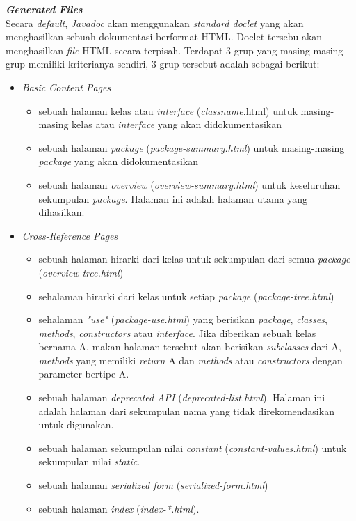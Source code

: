 \documentclass[a4paper,twoside]{article}
\begin{document}
\begin{enumerate}
\begin{enumerate}
\textbf{\textit{Generated Files}}\\
Secara {\it default}, {\it Javadoc} akan menggunakan {\it standard doclet} yang akan menghasilkan sebuah dokumentasi berformat HTML. Doclet tersebu akan menghasilkan {\it file} HTML secara terpisah. Terdapat 3 grup yang masing-masing grup memiliki kriterianya sendiri, 3 grup tersebut adalah sebagai berikut:
\begin{itemize}
	\item {\it Basic Content Pages}
	\begin{itemize}
		\item sebuah halaman kelas atau {\it interface} ({\it classname}.html) untuk masing-masing kelas atau {\it interface} yang akan didokumentasikan
		\item sebuah halaman {\it package} ({\it package-summary.html}) untuk masing-masing {\it package} yang akan didokumentasikan
		\item sebuah halaman {\it overview} ({\it overview-summary.html}) untuk keseluruhan sekumpulan {\it package}. Halaman ini adalah halaman utama yang dihasilkan.
	\end{itemize}
	\item {\it Cross-Reference Pages}
	\begin{itemize}
		\item sebuah halaman hirarki dari kelas untuk sekumpulan dari semua {\it package} ({\it overview-tree.html})
		\item sehalaman hirarki dari kelas untuk setiap {\it package} ({\it package-tree.html})
		\item sehalaman {\it "use"} ({\it package-use.html}) yang berisikan {\it package}, {\it classes}, {\it methods}, {\it constructors} atau {\it interface}. Jika diberikan sebuah kelas bernama A, makan halaman tersebut akan berisikan {\it subclasses} dari A, {\it methods} yang memiliki {\it return} A dan {\it methods} atau {\it constructors} dengan parameter bertipe A.
		\item sebuah halaman {\it deprecated API} ({\it deprecated-list.html}). Halaman ini adalah halaman dari sekumpulan nama yang tidak direkomendasikan untuk digunakan.
		\item sebuah halaman sekumpulan nilai {\it constant} ({\it constant-values.html}) untuk sekumpulan nilai {\it static}.
		\item sebuah halaman {\it serialized form} ({\it serialized-form.html})
		\item sebuah halaman {\it index} ({\it index-*.html}).
	\end{itemize}

\end{itemize}
\end{enumerate}
\end{enumerate}
\end{document}
